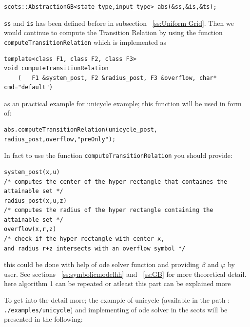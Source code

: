 \documentclass[a4paper]{amsart}
\begin{document}
\begin{lstlisting}[basicstyle=\footnotesize\ttfamily]
scots::AbstractionGB<state_type,input_type> abs(&ss,&is,&ts);
\end{lstlisting}

{\tt\small ss} and {\tt\small is} has been defined before in subsection ~\ref{ss:Uniform Grid}.
Then we would continue to compute the Transition Relation by using the function {\tt \small computeTransitionRelation} which is implemented as 
\begin{lstlisting}[basicstyle=\footnotesize\ttfamily]
template<class F1, class F2, class F3>
void computeTransitionRelation
	(	F1 &system_post, F2 &radius_post, F3 &overflow, char* cmd="default")

\end{lstlisting}
 as an practical example for unicycle  example; this function will be used in form of: 
 \begin{lstlisting}[basicstyle=\footnotesize\ttfamily]
 abs.computeTransitionRelation(unicycle_post, radius_post,overflow,"preOnly");
 \end{lstlisting}
 
In fact to use the function {\tt\small computeTransitionRelation} you should provide:
\begin{lstlisting}[basicstyle=\footnotesize\ttfamily]
system_post(x,u) 
/* computes the center of the hyper rectangle that containes the attainable set */
radius_post(x,u,z) 
/* computes the radius of the hyper rectangle containing the attainable set */ 
overflow(x,r,z)
/* check if the hyper rectangle with center x, 
and radius r+z intersects with an overflow symbol */
\end{lstlisting}
this could be done with help of ode solver function and providing $\beta$ and $\varphi$ by user. See sections ~\ref{ss:symbolicmodelhh} and ~\ref{ss:GB} for more theoretical detail. {\color{red} here algorithm 1 can be repeated or atleast this part can be explained more}

To get into the detail more; the example of unicycle (available in the path : {\tt\small ./examples/unicycle}) and implementing of ode solver in the scots will be presented in the following:
\end{document}
